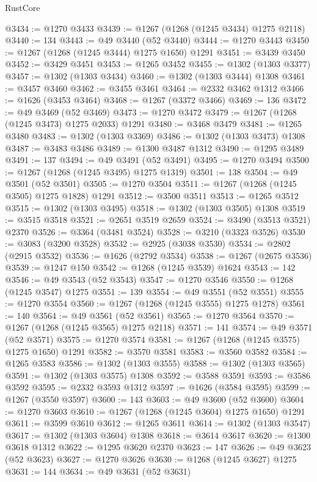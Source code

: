 \begin{lexlean}{RustCore}
\begin{coremodule}
@3434 := @1270 @3433
@3439 := @1267 (@1268 (@1245 @3434) @1275 @2118)
@3440 := 134
@3443 := @49 @3440 (@52 @3440)
@3444 := @1270 @3443
@3450 := @1267 (@1268 (@1245 @3444) @1275 @1650) @1291
@3451 := @3439 @3450
@3452 := @3429 @3451
@3453 := @1265 @3452
@3455 := @1302 (@1303 @3377)
@3457 := @1302 (@1303 @3434)
@3460 := @1302 (@1303 @3444) @1308
@3461 := @3457 @3460
@3462 := @3455 @3461
@3464 := @2332 @3462 @1312
@3466 := @1626 (@3453 @3464)
@3468 := @1267 (@3372 @3466)
@3469 := 136
@3472 := @49 @3469 (@52 @3469)
@3473 := @1270 @3472
@3479 := @1267 (@1268 (@1245 @3473) @1275 @2033) @1291
@3480 := @3468 @3479
@3481 := @1265 @3480
@3483 := @1302 (@1303 @3369)
@3486 := @1302 (@1303 @3473) @1308
@3487 := @3483 @3486
@3489 := @1300 @3487 @1312
@3490 := @1295 @3489
@3491 := 137
@3494 := @49 @3491 (@52 @3491)
@3495 := @1270 @3494
@3500 := @1267 (@1268 (@1245 @3495) @1275 @1319)
@3501 := 138
@3504 := @49 @3501 (@52 @3501)
@3505 := @1270 @3504
@3511 := @1267 (@1268 (@1245 @3505) @1275 @1828) @1291
@3512 := @3500 @3511
@3513 := @1265 @3512
@3515 := @1302 (@1303 @3495)
@3518 := @1302 (@1303 @3505) @1308
@3519 := @3515 @3518
@3521 := @2651 @3519 @2659
@3524 := @3490 (@3513 @3521) @2370
@3526 := @3364 (@3481 @3524)
@3528 := @3210 (@3323 @3526)
@3530 := @3083 (@3200 @3528)
@3532 := @2925 (@3038 @3530)
@3534 := @2802 (@2915 @3532)
@3536 := @1626 (@2792 @3534)
@3538 := @1267 (@2675 @3536)
@3539 := @1247 @150
@3542 := @1268 (@1245 @3539) @1624
@3543 := 142
@3546 := @49 @3543 (@52 @3543)
@3547 := @1270 @3546
@3550 := @1268 (@1245 @3547) @1275
@3551 := 139
@3554 := @49 @3551 (@52 @3551)
@3555 := @1270 @3554
@3560 := @1267 (@1268 (@1245 @3555) @1275 @1278)
@3561 := 140
@3564 := @49 @3561 (@52 @3561)
@3565 := @1270 @3564
@3570 := @1267 (@1268 (@1245 @3565) @1275 @2118)
@3571 := 141
@3574 := @49 @3571 (@52 @3571)
@3575 := @1270 @3574
@3581 := @1267 (@1268 (@1245 @3575) @1275 @1650) @1291
@3582 := @3570 @3581
@3583 := @3560 @3582
@3584 := @1265 @3583
@3586 := @1302 (@1303 @3555)
@3588 := @1302 (@1303 @3565)
@3591 := @1302 (@1303 @3575) @1308
@3592 := @3588 @3591
@3593 := @3586 @3592
@3595 := @2332 @3593 @1312
@3597 := @1626 (@3584 @3595)
@3599 := @1267 (@3550 @3597)
@3600 := 143
@3603 := @49 @3600 (@52 @3600)
@3604 := @1270 @3603
@3610 := @1267 (@1268 (@1245 @3604) @1275 @1650) @1291
@3611 := @3599 @3610
@3612 := @1265 @3611
@3614 := @1302 (@1303 @3547)
@3617 := @1302 (@1303 @3604) @1308
@3618 := @3614 @3617
@3620 := @1300 @3618 @1312
@3622 := @1295 @3620 @2370
@3623 := 147
@3626 := @49 @3623 (@52 @3623)
@3627 := @1270 @3626
@3630 := @1268 (@1245 @3627) @1275
@3631 := 144
@3634 := @49 @3631 (@52 @3631)

\end{coremodule}
\end{lexlean}
